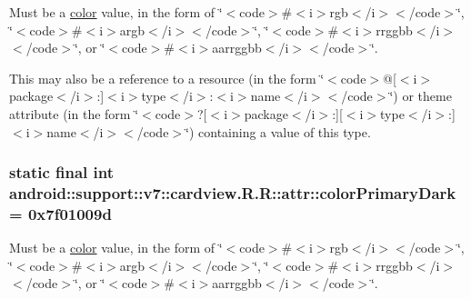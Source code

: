 Must be a \hyperlink{classandroid_1_1support_1_1v7_1_1cardview_1_1_r_1_1color}{color} value, in the form of \char`\"{}$<$code$>$\#$<$i$>$rgb$<$/i$>$$<$/code$>$\char`\"{}, \char`\"{}$<$code$>$\#$<$i$>$argb$<$/i$>$$<$/code$>$\char`\"{}, \char`\"{}$<$code$>$\#$<$i$>$rrggbb$<$/i$>$$<$/code$>$\char`\"{}, or \char`\"{}$<$code$>$\#$<$i$>$aarrggbb$<$/i$>$$<$/code$>$\char`\"{}. 

This may also be a reference to a resource (in the form \char`\"{}$<$code$>$@\mbox{[}$<$i$>$package$<$/i$>$:\mbox{]}$<$i$>$type$<$/i$>$:$<$i$>$name$<$/i$>$$<$/code$>$\char`\"{}) or theme attribute (in the form \char`\"{}$<$code$>$?\mbox{[}$<$i$>$package$<$/i$>$:\mbox{]}\mbox{[}$<$i$>$type$<$/i$>$:\mbox{]}$<$i$>$name$<$/i$>$$<$/code$>$\char`\"{}) containing a value of this type. \hypertarget{classandroid_1_1support_1_1v7_1_1cardview_1_1_r_1_1attr_c184e1bd698d808e0e55ce0ba202af73}{
\subsubsection[{colorPrimaryDark}]{\setlength{\rightskip}{0pt plus 5cm}static final int android::support::v7::cardview.R.R::attr::colorPrimaryDark = 0x7f01009d}}
\label{classandroid_1_1support_1_1v7_1_1cardview_1_1_r_1_1attr_c184e1bd698d808e0e55ce0ba202af73}


Must be a \hyperlink{classandroid_1_1support_1_1v7_1_1cardview_1_1_r_1_1color}{color} value, in the form of \char`\"{}$<$code$>$\#$<$i$>$rgb$<$/i$>$$<$/code$>$\char`\"{}, \char`\"{}$<$code$>$\#$<$i$>$argb$<$/i$>$$<$/code$>$\char`\"{}, \char`\"{}$<$code$>$\#$<$i$>$rrggbb$<$/i$>$$<$/code$>$\char`\"{}, or \char`\"{}$<$code$>$\#$<$i$>$aarrggbb$<$/i$>$$<$/code$>$\char`\"{}. 

